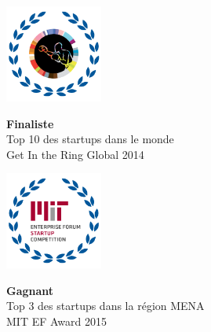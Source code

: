 \documentclass[12pt,a4paper]{report}
\begin{document}
		\begin{minipage}{0.5\textwidth}

		\begin{flushleft}
		\includegraphics[width=3.2cm,height=3.2cm]{graphics/10ww.png}\\
		\begin{flushleft}
		 { \scriptsize  \textbf{Finaliste} \\[0.2cm]Top 10 des startups dans le monde\\Get In the Ring Global 2014}

		\end{flushleft}

		 

		\end{flushleft}

		\end{minipage}
	\begin{minipage}{0.5\textwidth}

		\begin{flushleft}
		\includegraphics[width=3.2cm,height=3.2cm]{graphics/mit.png}\\
		\begin{flushleft}
		 { \scriptsize  \textbf{Gagnant} \\[0.2cm]Top 3 des startups dans la région MENA\\MIT EF Award 2015}

		\end{flushleft}

		 

		\end{flushleft}

		\end{minipage}
		
\end{document}
